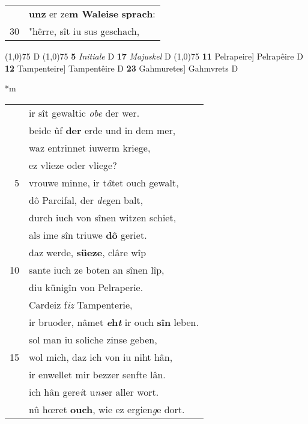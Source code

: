\documentclass[8pt,a4paper,notitlepage]{article}
\begin{document}
\begin{table}[ht]
\begin{minipage}[t]{0.5\linewidth}
\begin{tabular}{rl}
 & \textbf{unz} er ze\textbf{m Waleise} \textbf{sprach}:\\ 
30 & "hêrre, sît iu sus geschach,\\ 
\end{tabular}
\scriptsize
\line(1,0){75} \newline
D \newline
\line(1,0){75} \newline
\textbf{5} \textit{Initiale} D  \textbf{17} \textit{Majuskel} D  \newline
\line(1,0){75} \newline
\textbf{11} Pelrapeire] Pelrapêire D \textbf{12} Tampenteire] Tampentêire D \textbf{23} Gahmuretes] Gahmvrets D \newline
\end{minipage}
\hspace{0.5cm}
\begin{minipage}[t]{0.5\linewidth}
\small
\begin{center}*m
\end{center}
\begin{tabular}{rl}
 & ir sît gewaltic \textit{obe} der wer.\\ 
 & beide ûf \textbf{der} erde und in dem mer,\\ 
 & waz entrinnet iuwerm kriege,\\ 
 & ez vlieze oder vliege?\\ 
5 & vrouwe minne, ir t\textit{â}tet ouch gewalt,\\ 
 & dô Parcifal, der \textit{de}gen balt,\\ 
 & durch iuch von sînen witzen schiet,\\ 
 & als ime sîn triuwe \textbf{dô} geriet.\\ 
 & daz werde, \textbf{süeze}, clâre wîp\\ 
10 & sante iuch ze boten an sînen lîp,\\ 
 & diu künigîn von Pelraperie.\\ 
 & Cardeiz f\textit{iz} Tampenterie,\\ 
 & ir bruoder, nâmet \textbf{\textit{e}h\textit{t}} ir ouch \textbf{sîn} leben.\\ 
 & sol man iu soliche zinse geben,\\ 
15 & wol mich, daz ich von iu niht hân,\\ 
 & ir enwellet mir bezzer senfte lân.\\ 
 & ich hân gere\textit{i}t u\textit{ns}er aller wort.\\ 
 & nû hœret \textbf{ouch}, wie ez ergien\textit{g}e dort.\\ 

\end{tabular}
\end{minipage}
\end{table}
\end{document}
